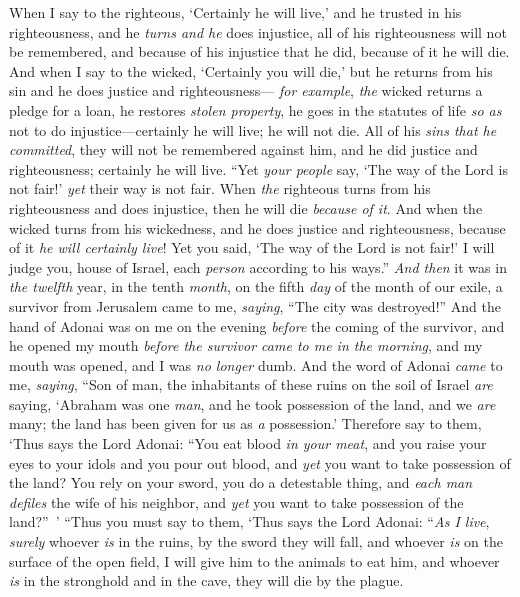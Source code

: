 \begin{biblechapter}
\verse When I say to the righteous, ‘Certainly he will live,’ and he trusted in his righteousness, and he \textit{turns and he} does injustice, all of his righteousness will not be remembered, and because of his injustice that he did, because of it he will die.
\verse And when I say to the wicked, ‘Certainly you will die,’ but he returns from his sin and he does justice and righteousness—
\verse \textit{for example}, \textit{the} wicked returns a pledge for a loan, he restores \textit{stolen property}, he goes in the statutes of life \textit{so as} not to do injustice—certainly he will live; he will not die.
\verse All of his \textit{sins that he committed}, they will not be remembered against him, and he did justice and righteousness; certainly he will live.
\verse “Yet \textit{your people} say, ‘The way of the Lord is not fair!’ \textit{yet} their way is not fair.
\verse When \textit{the} righteous turns from his righteousness and does injustice, then he will die \textit{because of it}.
\verse And when the wicked turns from his wickedness, and he does justice and righteousness, because of it \textit{he will certainly live}!
\verse Yet you said, ‘The way of the Lord is not fair!’ I will judge you, house of Israel, each \textit{person} according to his ways.”
\verse \textit{And then} it was in \textit{the twelfth} year, in the tenth \textit{month}, on the fifth \textit{day} of the month of our exile, a survivor from Jerusalem came to me, \textit{saying}, “The city was destroyed!”
\verse And the hand of Adonai was on me on the evening \textit{before} the coming of the survivor, and he opened my mouth \textit{before the survivor came to me in the morning}, and my mouth was opened, and I was \textit{no longer} dumb.
\verse And the word of Adonai \textit{came} to me, \textit{saying},
\verse “Son of man, the inhabitants of these ruins on the soil of Israel \textit{are} saying, ‘Abraham was one \textit{man}, and he took possession of the land, and we \textit{are} many; the land has been given for us as \textit{a} possession.’
\verse Therefore say to them, ‘Thus says the Lord Adonai: “You eat blood \textit{in your meat}, and you raise your eyes to your idols and you pour out blood, and \textit{yet} you want to take possession of the land?
\verse You rely on your sword, you do a detestable thing, and \textit{each man defiles} the wife of his neighbor, and \textit{yet} you want to take possession of the land?” ’
\verse “Thus you must say to them, ‘Thus says the Lord Adonai: “\textit{As I live}, \textit{surely} whoever \textit{is} in the ruins, by the sword they will fall, and whoever \textit{is} on the surface of the open field, I will give him to the animals to eat him, and whoever \textit{is} in the stronghold and in the cave, they will die by the plague.

\end{biblechapter}
